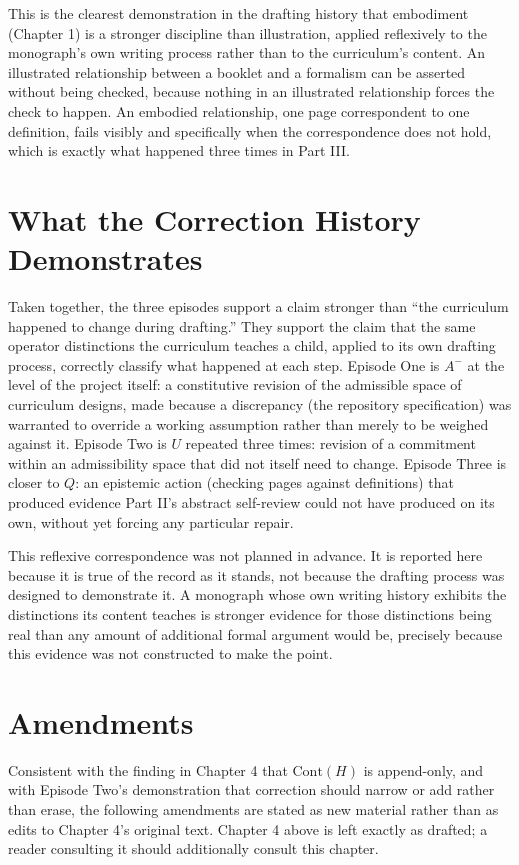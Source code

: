 \documentclass[11pt,twoside]{book}
\begin{document}
This is the clearest demonstration in the drafting history that embodiment (Chapter 1) is a stronger discipline than illustration, applied reflexively to the monograph's own writing process rather than to the curriculum's content. An illustrated relationship between a booklet and a formalism can be asserted without being checked, because nothing in an illustrated relationship forces the check to happen. An embodied relationship, one page correspondent to one definition, fails visibly and specifically when the correspondence does not hold, which is exactly what happened three times in Part III.

\chapter{What the Correction History Demonstrates}

Taken together, the three episodes support a claim stronger than ``the curriculum happened to change during drafting.'' They support the claim that the same operator distinctions the curriculum teaches a child, applied to its own drafting process, correctly classify what happened at each step. Episode One is $A^-$ at the level of the project itself: a constitutive revision of the admissible space of curriculum designs, made because a discrepancy (the repository specification) was warranted to override a working assumption rather than merely to be weighed against it. Episode Two is $U$ repeated three times: revision of a commitment within an admissibility space that did not itself need to change. Episode Three is closer to $Q$: an epistemic action (checking pages against definitions) that produced evidence Part II's abstract self-review could not have produced on its own, without yet forcing any particular repair.

This reflexive correspondence was not planned in advance. It is reported here because it is true of the record as it stands, not because the drafting process was designed to demonstrate it. A monograph whose own writing history exhibits the distinctions its content teaches is stronger evidence for those distinctions being real than any amount of additional formal argument would be, precisely because this evidence was not constructed to make the point.

\chapter{Amendments}

Consistent with the finding in Chapter 4 that $\mathrm{Cont}(H)$ is append-only, and with Episode Two's demonstration that correction should narrow or add rather than erase, the following amendments are stated as new material rather than as edits to Chapter 4's original text. Chapter 4 above is left exactly as drafted; a reader consulting it should additionally consult this chapter.
\end{document}
